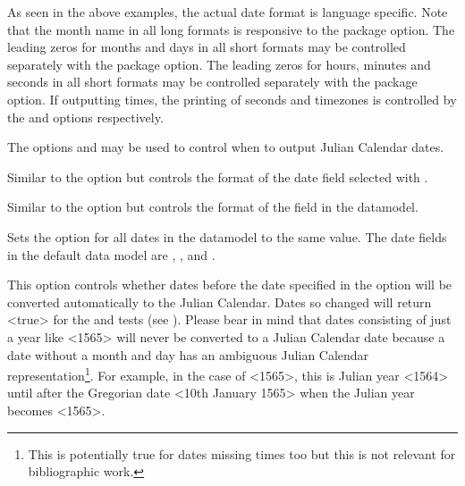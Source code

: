 \documentclass{ltxdockit}[2011/03/25]
\begin{document}
\begin{optionlist}
As seen in the above examples, the actual date format is language specific. Note that the month name in all long formats is responsive to the  package option. The leading zeros for months and days in all short formats may be controlled separately with the  package option. The leading zeros for hours, minutes and seconds in all short formats may be controlled separately with the  package option. If outputting times, the printing of seconds and timezones is controlled by the  and  options respectively.

The options  and   may be used to control when to output Julian Calendar dates.


Similar to the  option but controls the format of the date field selected with .


Similar to the  option but controls the format of the  field in the datamodel.


Sets the option for all dates in the datamodel to the same value. The date fields in the default data model are , ,  and .


This option controls whether dates before the date specified in the  option will be converted automatically to the Julian Calendar. Dates so changed will return <true> for the  and  tests (see ). Please bear in mind that dates consisting of just a year like <1565> will never be converted to a Julian Calendar date because a date without a month and day has an ambiguous Julian Calendar representation\footnote{This is potentially true for dates missing times too but this is not relevant for bibliographic work.}. For example, in the case of <1565>, this is Julian year <1564> until after the Gregorian date <10th January 1565> when the Julian year becomes <1565>.


\end{optionlist}
\end{document}
